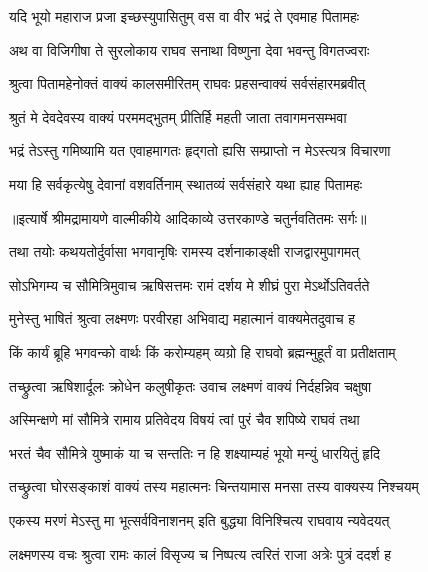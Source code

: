\twolineshloka
{यदि भूयो महाराज प्रजा इच्छस्युपासितुम्}
{वस वा वीर भद्रं ते एवमाह पितामहः} %

\twolineshloka
{अथ वा विजिगीषा ते सुरलोकाय राघव}
{सनाथा विष्णुना देवा भवन्तु विगतज्वराः} %

\twolineshloka
{श्रुत्वा पितामहेनोक्तं वाक्यं कालसमीरितम्}
{राघवः प्रहसन्वाक्यं सर्वसंहारमब्रवीत्} %

\twolineshloka
{श्रुतं मे देवदेवस्य वाक्यं परममद्भुतम्}
{प्रीतिर्हि महती जाता तवागमनसम्भवा} %

\twolineshloka
{भद्रं तेऽस्तु गमिष्यामि यत एवाहमागतः}
{हृद्गतो ह्यसि सम्प्राप्तो न मेऽस्त्यत्र विचारणा} %

\twolineshloka
{मया हि सर्वकृत्येषु देवानां वशवर्तिनाम्}
{स्थातव्यं सर्वसंहारे यथा ह्याह पितामहः} %


{॥इत्यार्षे श्रीमद्रामायणे वाल्मीकीये आदिकाव्ये उत्तरकाण्डे चतुर्नवतितमः सर्गः॥}


\twolineshloka
{तथा तयोः कथयतोर्दुर्वासा भगवानृषिः}
{रामस्य दर्शनाकाङ्क्षी राजद्वारमुपागमत्} %

\twolineshloka
{सोऽभिगम्य च सौमित्रिमुवाच ऋषिसत्तमः}
{रामं दर्शय मे शीघ्रं पुरा मेऽर्थोऽतिवर्तते} %

\twolineshloka
{मुनेस्तु भाषितं श्रुत्वा लक्ष्मणः परवीरहा}
{अभिवाद्य महात्मानं वाक्यमेतदुवाच ह} %

\twolineshloka
{किं कार्यं ब्रूहि भगवन्को वार्थः किं करोम्यहम्}
{व्यग्रो हि राघवो ब्रह्मन्मुहूर्तं वा प्रतीक्षताम्} %

\twolineshloka
{तच्छ्रुत्वा ऋषिशार्दूलः क्रोधेन कलुषीकृतः}
{उवाच लक्ष्मणं वाक्यं निर्दहन्निव चक्षुषा} %

\twolineshloka
{अस्मिन्क्षणे मां सौमित्रे रामाय प्रतिवेदय}
{विषयं त्वां पुरं चैव शपिष्ये राघवं तथा} %

\twolineshloka
{भरतं चैव सौमित्रे युष्माकं या च सन्ततिः}
{न हि शक्ष्याम्यहं भूयो मन्युं धारयितुं हृदि} %

\twolineshloka
{तच्छ्रुत्वा घोरसङ्काशं वाक्यं तस्य महात्मनः}
{चिन्तयामास मनसा तस्य वाक्यस्य निश्चयम्} %

\twolineshloka
{एकस्य मरणं मेऽस्तु मा भूत्सर्वविनाशनम्}
{इति बुद्ध्या विनिश्चित्य राघवाय न्यवेदयत्} %

\twolineshloka
{लक्ष्मणस्य वचः श्रुत्वा रामः कालं विसृज्य च}
{निष्पत्य त्वरितं राजा अत्रेः पुत्रं ददर्श ह} %

